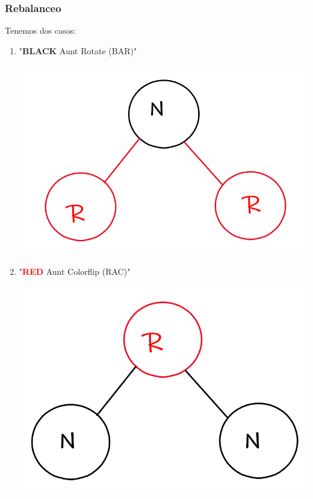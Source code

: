 \documentclass{article}
\begin{document}
\subsubsection*{Rebalanceo}
Tenemos dos casos:
\begin{enumerate}
    \item "\textbf{BLACK} Aunt Rotate (BAR)" 
    \begin{center}
        \includegraphics[width=.25\textwidth]{Images/Rotate.png}
    \end{center}
    \item "\textbf{\textcolor{red}{RED}} Aunt Colorflip (RAC)"
    \begin{center}
        \includegraphics[width=.25\textwidth]{Images/Colorflip.png}
    \end{center}
\end{enumerate}
\end{document}
